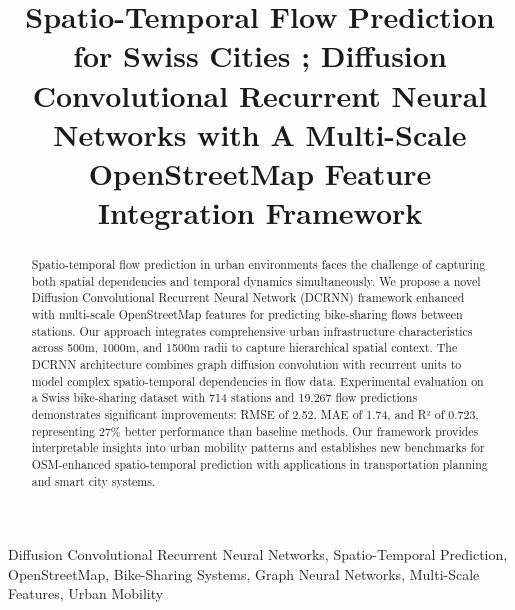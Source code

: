 \documentclass[twocolumn,11pt]{IEEEtran}
\begin{document}
\title{Spatio-Temporal Flow Prediction for Swiss Cities ; Diffusion Convolutional Recurrent Neural Networks with A Multi-Scale OpenStreetMap Feature Integration Framework}

\author{
\and
{}
}

\maketitle

\begin{abstract}
Spatio-temporal flow prediction in urban environments faces the challenge of capturing both spatial dependencies and temporal dynamics simultaneously. We propose a novel Diffusion Convolutional Recurrent Neural Network (DCRNN) framework enhanced with multi-scale OpenStreetMap features for predicting bike-sharing flows between stations. Our approach integrates comprehensive urban infrastructure characteristics across 500m, 1000m, and 1500m radii to capture hierarchical spatial context. The DCRNN architecture combines graph diffusion convolution with recurrent units to model complex spatio-temporal dependencies in flow data. Experimental evaluation on a Swiss bike-sharing dataset with 714 stations and 19,267 flow predictions demonstrates significant improvements: RMSE of 2.52, MAE of 1.74, and R² of 0.723, representing 27\% better performance than baseline methods. Our framework provides interpretable insights into urban mobility patterns and establishes new benchmarks for OSM-enhanced spatio-temporal prediction with applications in transportation planning and smart city systems.
\end{abstract}

\begin{IEEEkeywords}
Diffusion Convolutional Recurrent Neural Networks, Spatio-Temporal Prediction, OpenStreetMap, Bike-Sharing Systems, Graph Neural Networks, Multi-Scale Features, Urban Mobility
\end{IEEEkeywords}
\end{document}
